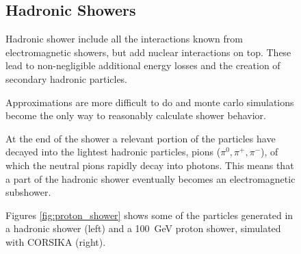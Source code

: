 \begin{figure}
\subsection{Hadronic Showers}
Hadronic shower include all the interactions known from 
electromagnetic showers, but add nuclear interactions on top.
These lead to non-negligible additional energy losses 
and the creation of secondary hadronic particles.

Approximations are more difficult to do and monte carlo simulations 
become the only way to reasonably calculate shower behavior.

At the end of the shower a relevant portion of the particles have decayed into the 
lightest hadronic particles, pions ($\pi^0, \pi^+, \pi^-$), of which the neutral pions 
rapidly decay into photons.
This means that a part of the hadronic shower
eventually becomes an electromagnetic subshower.

Figures \ref{fig:proton_shower}
shows some of the particles generated in a hadronic shower (left)
and a \SI{100}{\giga\electronvolt} proton shower, simulated with CORSIKA (right).


\end{figure}
